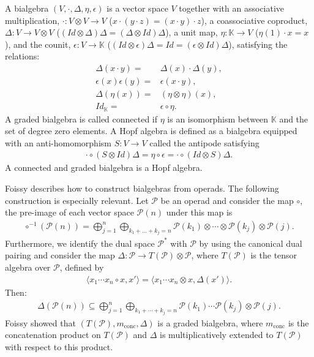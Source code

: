 \documentclass[10pt,a4paper]{article}
\begin{document}
A bialgebra $(V,\cdot,\Delta,\eta,\epsilon )$ is a vector space $V$ together with an associative multiplication, $\cdot : V \otimes V \to V$ ($x \cdot (y \cdot z)= (x \cdot y) \cdot z $), a coassociative coproduct, $\Delta: V \to V \otimes V$ ($(Id \otimes \Delta)\Delta=(\Delta \otimes Id)\Delta$), a unit map, $\eta: \mathbb{K} \to V$ ($\eta(1)\cdot x=x$), and the counit, $\epsilon: V \to \mathbb{K}$ ($(Id \otimes \epsilon)\Delta=Id=(\epsilon \otimes Id)\Delta$), satisfying the relations:
\begin{align*}
\Delta(x \cdot y)=&\Delta(x) \cdot \Delta(y),\\
\epsilon(x)\epsilon(y)=&\epsilon(x \cdot y),\\
\Delta(\eta(x))=&(\eta \otimes \eta)(x),\\
Id_{\mathbb{K}} =& \epsilon \circ \eta.
\end{align*}
A graded bialgebra is called connected if $\eta$ is an isomorphism between $\mathbb{K}$ and the set of degree zero elements. A Hopf algebra is defined as a bialgebra equipped with an anti-homomorphism $S: V \to V$ called the antipode satisfying
\begin{align*}
\cdot \circ (S \otimes Id)\Delta=\eta \circ \epsilon = \cdot \circ ( Id \otimes S
)\Delta.
\end{align*}
A connected and graded bialgebra is a Hopf algebra. 

Foissy \cite{Foissy2017} describes how to construct bialgebras from operads. The following construction is especially relevant. Let $\mathcal{P}$ be an operad and consider the map $\circ$, the pre-image of each vector space $\mathcal{P}(n)$ under this map is
\begin{align*}
\circ^{-1}(\mathcal{P}(n))
=\bigoplus_{j=1}^{n} \bigoplus_{k_1+\dots+k_j=n} \mathcal{P}(k_1) \otimes \cdots \otimes \mathcal{P}(k_j) \otimes \mathcal{P}(j) .
\end{align*}
Furthermore, we identify the dual space $\mathcal{P}^{\ast}$ with $\mathcal{P}$ by using the canonical dual pairing and consider the map $\Delta: \mathcal{P} \to T(\mathcal{P}) \otimes \mathcal{P}$, where $T(\mathcal{P})$ is the tensor algebra over $\mathcal{P}$, defined by
\begin{align*}
\langle x_1 \cdots x_n \circ x, x' \rangle = \langle x_1 \cdots x_n \otimes x, \Delta(x') \rangle.
\end{align*}
Then:
\begin{align*}
\Delta(\mathcal{P}(n))  \subseteq \bigoplus_{j=1}^{n} \bigoplus_{k_1+\cdots+k_j=n} \mathcal{P}(k_1) \cdots \mathcal{P}(k_j) \otimes \mathcal{P}(j) .
\end{align*}
Foissy showed that $(T(\mathcal{P}),m_{\text{conc}},\Delta)$ is a graded bialgebra, where $m_{\text{conc}}$ is the concatenation product on $T(\mathcal{P})$ and $\Delta$ is multiplicatively extended to $T(\mathcal{P})$ with respect to this product. \\
\end{document}
